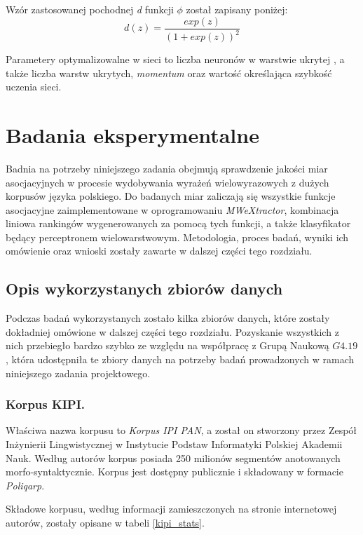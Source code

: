 \documentclass[11pt,a4paper]{llncs}
\begin{document}
Wzór zastosowanej pochodnej \emph{d} funkcji \( \phi \) został zapisany poniżej:
$$ d(z) = \frac{exp(z)}{(1 + exp(z))^{2}} $$



Parametery optymalizowalne w sieci to liczba neuronów w warstwie ukrytej \cite{coling}, a także liczba warstw ukrytych, \emph{momentum} oraz wartość określająca szybkość uczenia sieci.


\section{Badania eksperymentalne}\label{s4}

Badnia na potrzeby niniejszego zadania obejmują sprawdzenie jakości miar asocjacyjnych w procesie wydobywania wyrażeń wielowyrazowych z dużych korpusów języka polskiego.
Do badanych miar zaliczają się wszystkie funkcje asocjacyjne zaimplementowane w oprogramowaniu \emph{MWeXtractor}, kombinacja liniowa rankingów wygenerowanych za pomocą tych funkcji, a także klasyfikator będący perceptronem wielowarstwowym.
Metodologia, proces badań, wyniki ich omówienie oraz wnioski zostały zawarte w dalszej części tego rozdziału.

\subsection{Opis wykorzystanych zbiorów danych}
Podczas badań wykorzystanych zostało kilka zbiorów danych, które zostały dokładniej omówione w dalszej części tego rozdziału.
Pozyskanie wszystkich z nich przebiegło bardzo szybko ze względu na współpracę z Grupą Naukową $G4.19$, która udostępniła te zbiory danych na potrzeby badań prowadzonych w ramach niniejszego zadania projektowego.

\subsubsection{Korpus KIPI.}

Właściwa nazwa korpusu to \emph{Korpus IPI PAN}, a został on stworzony przez Zespół Inżynierii Lingwistycznej w Instytucie Podstaw Informatyki Polskiej Akademii Nauk.
Według autorów korpus posiada 250 milionów segmentów anotowanych morfo-syntaktycznie.
Korpus jest dostępny publicznie i składowany w formacie \emph{Poliqarp}.

Składowe korpusu, według informacji zamieszczonych na stronie internetowej autorów, zostały opisane w tabeli \ref{kipi_stats}.
\end{document}
